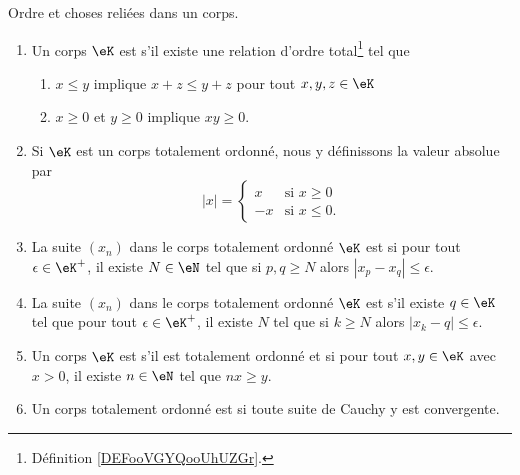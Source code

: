 \begin{definition}      \label{DefKCGBooLRNdJf}
    Ordre et choses reliées dans un corps.
    \begin{enumerate}
        \item \label{ITEMooOOOVooJWwIQr}
            Un corps \( \eK\) est  s'il existe une relation d'ordre total\footnote{Définition \ref{DEFooVGYQooUhUZGr}.} tel que
            \begin{enumerate}
                \item
                    \( x\leq y\) implique \( x+z\leq y+z\) pour tout \( x,y,z\in \eK\)
                \item   \label{CONDooBYYDooElXgPO}
                    \( x\geq 0\) et \( y\geq 0\) implique \( xy\geq 0\).
            \end{enumerate}
        \item       \label{ItemooWUGSooRSRvYC}
            Si \( \eK\) est un corps totalement ordonné, nous y définissons la valeur absolue par
            \begin{equation}
                | x |=\begin{cases}
                    x    &   \text{si }x\geq 0\\
                    -x    &    \text{si } x\leq 0.
                \end{cases}
            \end{equation}
        \item       \label{ItemVXOZooTYpcYN}
    La suite \( (x_n)\) dans le corps totalement ordonné \( \eK\) est  si pour tout \( \epsilon\in \eK^+\), il existe \( N\in \eN\) tel que si \( p,q\geq N\) alors \( | x_p-x_q |\leq \epsilon\).
\item       \label{ITEMooDERQooLmJwFR}
    La suite \( (x_n)\) dans le corps totalement ordonné \( \eK\) est  s'il existe \( q\in \eK\) tel que pour tout \( \epsilon\in \eK^+\), il existe \( N\) tel que si \( k\geq N\) alors \( | x_k-q |\leq \epsilon\).
\item   \label{ItemooDZQKooPsqeRf}
            Un corps \( \eK\) est  s'il est totalement ordonné et si pour tout \( x,y\in \eK\) avec \( x>0\), il existe \( n\in \eN\) tel que \( nx\geq y\).
        \item       \label{ITEMooKZZYooDaidGU}
            Un corps totalement ordonné est  si toute suite de Cauchy y est convergente.
    \end{enumerate}
\end{definition}

